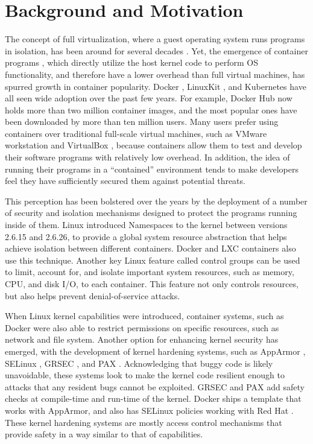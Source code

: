 \section{Background and Motivation}
\label{sec.motivation}
The concept of full virtualization, where a guest operating system runs programs in isolation, has been around for several decades \cite{OS-Level-Virtualization}. 
Yet, the emergence of container programs \cite{Containers_and_VirtualMachines}, which directly utilize the host kernel code to perform OS functionality, and therefore have a lower overhead than full virtual machines, 
has spurred  growth in  container popularity.  Docker \cite{Docker}, LinuxKit \cite{LinuxKit}, and Kubernetes \cite{Kubernetes} have all seen wide adoption over the past few years. 
For example, Docker Hub \cite{DockerHub} now holds more than two million container images, and the most popular ones have been downloaded by more than ten million users. 
Many users prefer using containers over traditional full-scale virtual machines, such as VMware workstation \cite{VMWare-Workstation} and VirtualBox \cite{VirtualBox}, 
because containers allow them to test and develop their software programs with relatively low overhead. 
In addition, the idea of running their programs in a “contained” environment tends to make developers feel they have sufficiently secured them against potential threats. 

This perception has been bolstered over the years by the deployment of a number of security and isolation mechanisms designed to protect the programs running inside of them. 
Linux introduced Namespaces \cite{namespaces} to the kernel between versions 2.6.15 and 2.6.26, to provide a global system resource abstraction that helps achieve isolation between different containers. 
Docker and LXC \cite{LXC} containers also use this technique. 
Another key Linux feature called control groups \cite{cgroups} can be used to limit, account for, and isolate important system resources, such as memory, CPU, and disk I/O, to each container.  
This feature not only controls resources, but also helps prevent denial-of-service attacks. 

When Linux kernel capabilities \cite{linux-kernel-capabilities} were introduced, container systems, such as Docker were also able to restrict permissions on specific resources, such as network and file system. 
Another option for enhancing kernel security has emerged, with the development of kernel hardening systems, such as AppArmor \cite{AppArmor}, SELinux \cite{SELinux}, GRSEC \cite{GRSEC}, and PAX \cite{PAX}. 
Acknowledging that buggy code is likely unavoidable,  these systems look to make the kernel code resilient enough to attacks that any resident bugs cannot be exploited. 
GRSEC and PAX add safety checks at compile-time and run-time of the kernel. Docker ships a template that works with AppArmor, and also has SELinux policies working with Red Hat \cite{red-hat}. 
These kernel hardening systems are mostly access control mechanisms that provide safety in a way similar to that of capabilities. 

